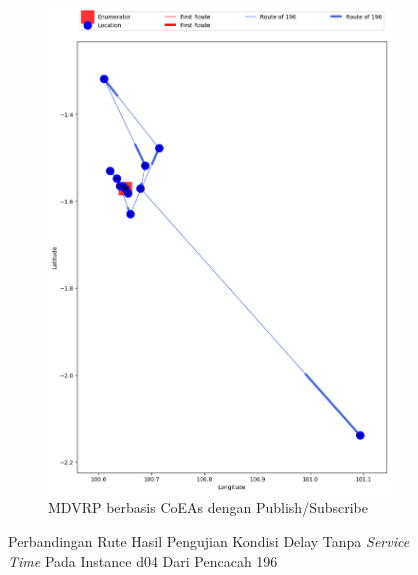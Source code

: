 \begin{figure}[H]\ContinuedFloat
	\centering
	\begin{subfigure}[t]{\textwidth}
		\centering
		\includegraphics[width=\textwidth]{Resources/Images/delayed_5/real_m15_n100_delayed_5_196_pubsub_coes}
		\caption{MDVRP berbasis CoEAs dengan Publish/Subscribe}
		\label{fig:real_m15_n100_delayed_5_196_pubsub_coes}
	\end{subfigure}
	\caption{Perbandingan Rute Hasil Pengujian Kondisi Delay Tanpa \textit{Service Time} Pada Instance d04 Dari Pencacah 196}
	\label{fig:real_m15_n100_delayed_5_196_contd}
\end{figure}


